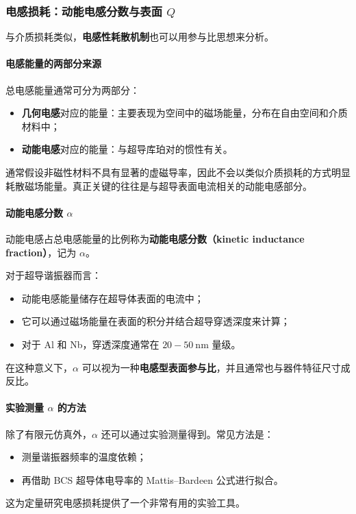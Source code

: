 \documentclass[12pt,a4paper,oneside]{ctexbook}
\begin{document}
\subsubsection{电感损耗：动能电感分数与表面 \(Q\)}

与介质损耗类似，\textbf{电感性耗散机制}也可以用参与比思想来分析。

\paragraph{电感能量的两部分来源}
总电感能量通常可分为两部分：
\begin{itemize}
    \item \textbf{几何电感}对应的能量：主要表现为空间中的磁场能量，分布在自由空间和介质材料中；
    \item \textbf{动能电感}对应的能量：与超导库珀对的惯性有关。
\end{itemize}

通常假设非磁性材料不具有显著的虚磁导率，因此不会以类似介质损耗的方式明显耗散磁场能量。真正关键的往往是与超导表面电流相关的动能电感部分。

\paragraph{动能电感分数 \(\alpha\)}
动能电感占总电感能量的比例称为\textbf{动能电感分数（kinetic inductance fraction）}，记为 \(\alpha\)。

对于超导谐振器而言：
\begin{itemize}
    \item 动能电感能量储存在超导体表面的电流中；
    \item 它可以通过磁场能量在表面的积分并结合超导穿透深度来计算；
    \item 对于 Al 和 Nb，穿透深度通常在 \(20\!-\!50~\mathrm{nm}\) 量级。
\end{itemize}

在这种意义下，\(\alpha\) 可以视为一种\textbf{电感型表面参与比}，并且通常也与器件特征尺寸成反比。

\paragraph{实验测量 \(\alpha\) 的方法}
除了有限元仿真外，\(\alpha\) 还可以通过实验测量得到。常见方法是：
\begin{itemize}
    \item 测量谐振器频率的温度依赖；
    \item 再借助 BCS 超导体电导率的 Mattis--Bardeen 公式进行拟合。
\end{itemize}
这为定量研究电感损耗提供了一个非常有用的实验工具。
\end{document}
